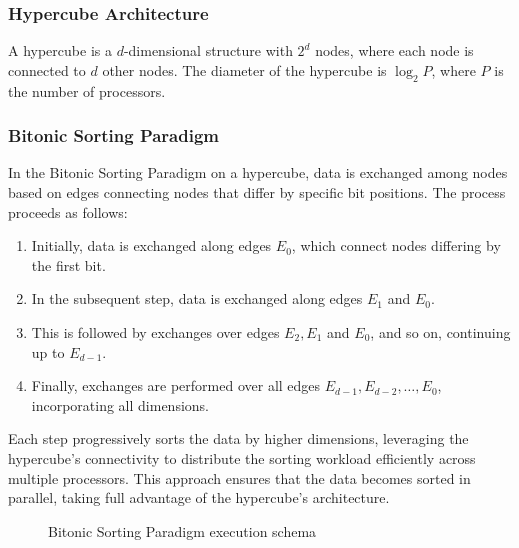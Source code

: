 \documentclass[article,12pt,conference]{ieeeconf} %
\begin{document}
\subsubsection{Hypercube Architecture}
A hypercube\cite{boman1990hypercube} is a $d$-dimensional structure with $2^d$ nodes, where each node is connected to $d$ other nodes. The diameter of the hypercube is $\log_2{P}$, where $P$ is the number of processors.\par

\subsubsection{Bitonic Sorting Paradigm}
In the Bitonic Sorting Paradigm\cite{batcher1968sorting} on a hypercube, data is exchanged among nodes based on edges connecting nodes that differ by specific bit positions. The process proceeds as follows:
\begin{enumerate}
    \item Initially, data is exchanged along edges $E_0$, which connect nodes differing by the first bit.
    \item In the subsequent step, data is exchanged along edges $E_1$ and $E_0$.
    \item This is followed by exchanges over edges $E_2, E_1$ and $E_0$, and so on, continuing up to $E_{d-1}$.
    \item Finally, exchanges are performed over all edges $E_{d-1}, E_{d-2}, \ldots, E_0$, incorporating all dimensions.
\end{enumerate}

Each step progressively sorts the data by higher dimensions, leveraging the hypercube's connectivity to distribute the sorting workload efficiently across multiple processors. This approach ensures that the data becomes sorted in parallel, taking full advantage of the hypercube's architecture.\par

\begin{figure}[thpb]
\centering
{}
\caption{Bitonic Sorting Paradigm execution schema}
\end{figure}
\end{document}
